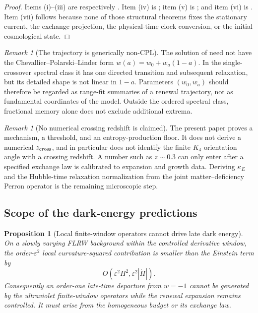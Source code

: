 \documentclass[11pt]{article}
\newtheorem{proposition}[theorem]{Proposition}
\theoremstyle{definition}
\theoremstyle{remark}
\newtheorem{remark}[theorem]{Remark}
\newcommand{\eps}{\varepsilon}
\begin{document}
\begin{proof}
Items (i)--(iii) are respectively
.
Item (iv) is
; item (v) is
; and item (vi)
is .  Item (vii)
follows because none of those structural theorems fixes the stationary current,
the exchange projection, the physical-time clock conversion, or the initial
cosmological state.
\end{proof}

\begin{remark}[The trajectory is generically non-CPL]
The solution of  need not have the
Chevallier--Polarski--Linder form \(w(a)=w_0+w_a(1-a)\).  In the
single-crossover spectral class it has one directed transition and subsequent
relaxation, but its detailed shape is not linear in \(1-a\).  Parameters
\((w_0,w_a)\) should therefore be regarded as range-fit summaries of a renewal
trajectory, not as fundamental coordinates of the model.  Outside the ordered
spectral class, fractional memory alone does not exclude additional extrema.
\end{remark}

\begin{remark}[No numerical crossing redshift is claimed]
The present paper proves a mechanism, a threshold, and an entropy-production
floor.  It does not derive a numerical \(z_{\rm cross}\), and in particular does
not identify the finite \(K_4\) orientation angle with a crossing redshift.  A
number such as \(z\sim0.3\) can only enter after a specified exchange law is
calibrated to expansion and growth data.  Deriving \(\kappa_E\) and the
Hubble-time relaxation normalization from the joint matter--deficiency Perron
operator is the remaining microscopic step.
\end{remark}

\subsection{Scope of the dark-energy predictions}
\label{subsec:dark-energy-status}

\begin{proposition}[Local finite-window operators cannot drive late dark energy]
\label{prop:late-finite-window-null}
On a slowly varying FLRW background within the controlled derivative window,
the order-\(\eps^2\) local curvature-squared contribution is smaller than the
Einstein term by
\[
  O\!\left(\eps^2H^2,\eps^2|\dot H|\right).
\]
Consequently an order-one late-time departure from \(w=-1\) cannot be generated
by the ultraviolet finite-window operators while the renewal expansion remains
controlled.  It must arise from the homogeneous budget or its exchange law.
\end{proposition}
\end{document}
